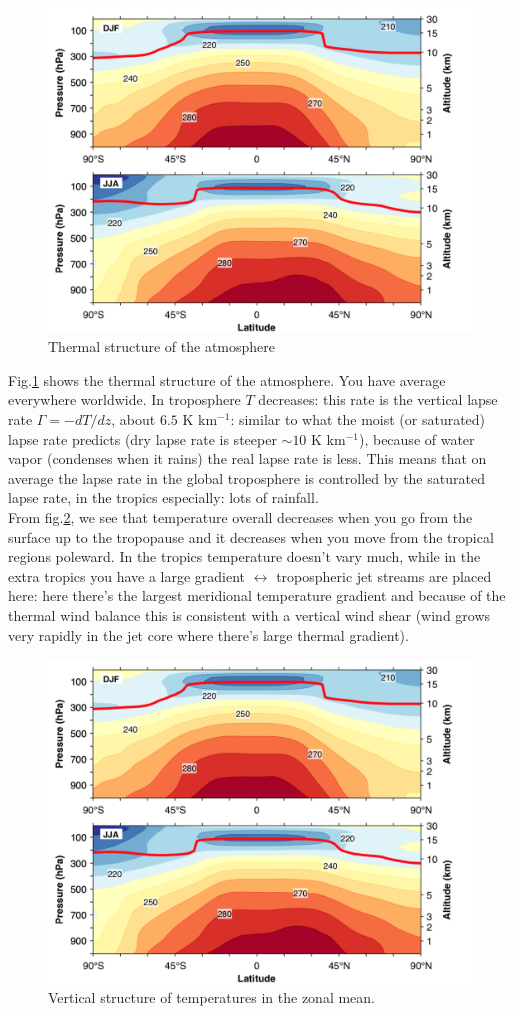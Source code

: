 \begin{figure}[htpb]
    \centering
    \includegraphics[width=0.45\linewidth]{uploads/thermal structure.png}
    \caption{Thermal structure of the atmosphere}
    \label{fig:thermal structure}
\end{figure}
Fig.\ref{fig:thermal structure} shows the thermal structure of the atmosphere. You have average everywhere worldwide. In troposphere $T$ decreases: this rate is the vertical lapse rate $\Gamma=-dT/dz$, about $6.5$ K km$^{-1}$: similar to what the moist (or saturated) lapse rate predicts (dry lapse rate is steeper $\sim 10$ K km$^{-1}$), because of water vapor (condenses when it rains) the real lapse rate is less. This means that on average the lapse rate in the global troposphere is controlled by the saturated lapse rate, in the tropics especially: lots of rainfall. \\
[0.2 cm]

From fig.\ref{fig:vert structure of T}, we see that temperature overall decreases when you go from the surface up to the tropopause and it decreases when you move from the tropical regions poleward. In the tropics temperature doesn't vary much, while in the extra tropics you have a large gradient $\leftrightarrow$ tropospheric jet streams are placed here: here there's the largest meridional temperature gradient and because of the thermal wind balance this is consistent with a vertical wind shear (wind grows very rapidly in the jet core where there's large thermal gradient).
\begin{figure}[htpb]
    \centering
    \includegraphics[width=0.5\linewidth]{uploads/Thermal structure.png}
    \caption{Vertical structure of temperatures in the zonal mean.}
    \label{fig:vert structure of T}
\end{figure}


